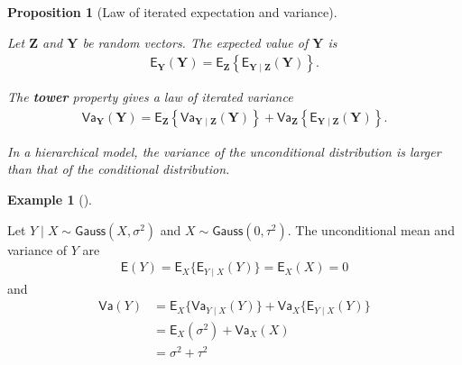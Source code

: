 \documentclass[
  11pt,
  letterpaper,
]{scrbook}
\theoremstyle{definition}
\theoremstyle{definition}
\newtheorem{example}{Example}[chapter]
\theoremstyle{definition}
\theoremstyle{plain}
\newtheorem{proposition}{Proposition}[chapter]
\theoremstyle{plain}
\theoremstyle{remark}
\begin{document}
\begin{proposition}[Law of iterated expectation and
variance]\protect\hypertarget{prp-iteratedexpectation}{}\label{prp-iteratedexpectation}

Let \(\boldsymbol{Z}\) and \(\boldsymbol{Y}\) be random vectors. The
expected value of \(\boldsymbol{Y}\) is \begin{align*}
\mathsf{E}_{\boldsymbol{Y}}(\boldsymbol{Y}) = \mathsf{E}_{\boldsymbol{Z}}\left\{\mathsf{E}_{\boldsymbol{Y} \mid \boldsymbol{Z}}(\boldsymbol{Y})\right\}.
\end{align*}

The \textbf{tower} property gives a law of iterated variance
\begin{align*}
\mathsf{Va}_{\boldsymbol{Y}}(\boldsymbol{Y}) = \mathsf{E}_{\boldsymbol{Z}}\left\{\mathsf{Va}_{\boldsymbol{Y} \mid \boldsymbol{Z}}(\boldsymbol{Y})\right\} + \mathsf{Va}_{\boldsymbol{Z}}\left\{\mathsf{E}_{\boldsymbol{Y} \mid \boldsymbol{Z}}(\boldsymbol{Y})\right\}.
\end{align*}

In a hierarchical model, the variance of the unconditional distribution
is larger than that of the conditional distribution.

\end{proposition}

\begin{example}[]\protect\hypertarget{exm-iteratedmean-gauss}{}\label{exm-iteratedmean-gauss}

Let \(Y \mid X\sim \mathsf{Gauss}(X, \sigma^2)\) and
\(X \sim \mathsf{Gauss}(0, \tau^2)\). The unconditional mean and
variance of \(Y\) are \begin{align*}
\mathsf{E}(Y) = \mathsf{E}_{X}\{\mathsf{E}_{Y\mid X}(Y)\}= \mathsf{E}_{X}(X) = 0
\end{align*} and \begin{align*}
\mathsf{Va}(Y) &= \mathsf{E}_{X}\{\mathsf{Va}_{Y\mid X}(Y)\} + \mathsf{Va}_{X}\{\mathsf{E}_{Y\mid X}(Y)\} \\&= \mathsf{E}_{X}(\sigma^2) + \mathsf{Va}_{X}(X)
\\&= \sigma^2 + \tau^2
\end{align*}

\end{example}
\end{document}
